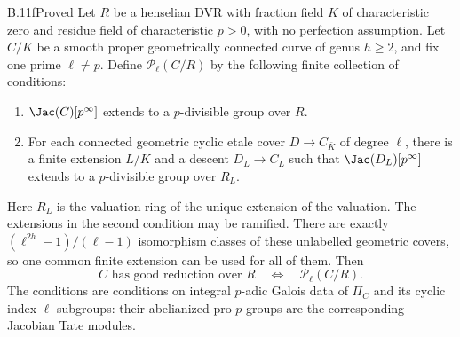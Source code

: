 \begin{claim}{B.11f}{Proved}
Let $R$ be a henselian DVR with fraction field $K$ of characteristic
zero and residue field of characteristic $p>0$, with no perfection
assumption. Let $C/K$ be a smooth proper geometrically connected curve
of genus $h\ge2$, and fix one prime $\ell\ne p$. Define
$\mathcal P_\ell(C/R)$ by the following finite collection of conditions:

\begin{enumerate}
\item $\Jac(C)[p^\infty]$ extends to a $p$-divisible group over $R$.
\item For each connected geometric cyclic etale cover
$D\to C_{\bar K}$ of degree $\ell$, there is a finite extension
$L/K$ and a descent $D_L\to C_L$ such that
$\Jac(D_L)[p^\infty]$ extends to a $p$-divisible group over $R_L$.
\end{enumerate}
Here $R_L$ is the valuation ring of the unique extension of the
valuation. The extensions in the second condition may be ramified.
There are exactly $(\ell^{2h}-1)/(\ell-1)$ isomorphism classes of
these unlabelled geometric covers, so one common finite extension
can be used for all of them. Then
\[
          C\text{ has good reduction over }R
          \quad\Longleftrightarrow\quad\mathcal P_\ell(C/R).
\]
The conditions are conditions on integral $p$-adic Galois data of
$\Pi_C$ and its cyclic index-$\ell$ subgroups: their abelianized
pro-$p$ groups are the corresponding Jacobian Tate modules.
\end{claim}
